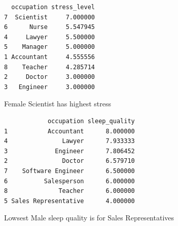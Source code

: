 \documentclass[
  letterpaper,
  DIV=11,
  numbers=noendperiod]{scrartcl}
\newenvironment{Shaded}{\begin{snugshade}}{\end{snugshade}}
\newcommand{\AttributeTok}[1]{\textcolor[rgb]{0.40,0.45,0.13}{#1}}
\newcommand{\FunctionTok}[1]{\textcolor[rgb]{0.28,0.35,0.67}{#1}}
\newcommand{\NormalTok}[1]{\textcolor[rgb]{0.00,0.23,0.31}{#1}}
\newcommand{\OtherTok}[1]{\textcolor[rgb]{0.00,0.23,0.31}{#1}}
\newcommand{\SpecialCharTok}[1]{\textcolor[rgb]{0.37,0.37,0.37}{#1}}
\begin{document}
\begin{verbatim}
  occupation stress_level
7  Scientist     7.000000
6      Nurse     5.547945
4     Lawyer     5.500000
5    Manager     5.000000
1 Accountant     4.555556
8    Teacher     4.285714
2     Doctor     3.000000
3   Engineer     3.000000
\end{verbatim}

Female Scientist has highest stress

\begin{Shaded}
\end{Shaded}

\begin{verbatim}
            occupation sleep_quality
1           Accountant      8.000000
4               Lawyer      7.933333
3             Engineer      7.806452
2               Doctor      6.579710
7    Software Engineer      6.500000
6          Salesperson      6.000000
8              Teacher      6.000000
5 Sales Representative      4.000000
\end{verbatim}

Lowsest Male sleep quality is for Sales Representatives

\begin{Shaded}
\end{Shaded}
\end{document}
